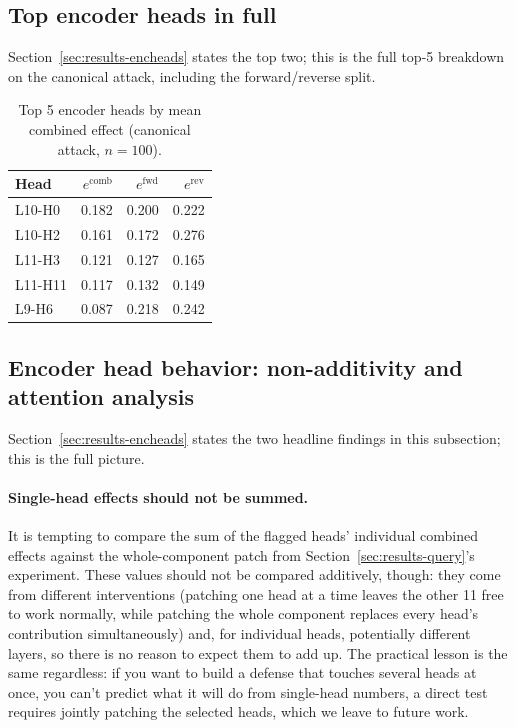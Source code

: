 \documentclass[11pt]{article}
\newcommand{\fwd}{\ensuremath{e^{\mathrm{fwd}}}}
\newcommand{\rev}{\ensuremath{e^{\mathrm{rev}}}}
\newcommand{\comb}{\ensuremath{e^{\mathrm{comb}}}}
\begin{document}
\subsection{Top encoder heads in full}
\label{sec:appendix-enctable}

Section~\ref{sec:results-encheads} states the top two; this is the full
top-5 breakdown on the canonical attack, including the forward/reverse
split.

\begin{table}[H]
\centering
\caption{Top 5 encoder heads by mean combined effect (canonical attack,
$n=100$).}
\label{tab:enctophead}
\small
\begin{tabular}{lrrr}
\toprule
Head & $\comb$ & $\fwd$ & $\rev$ \\
\midrule
L10-H0  & 0.182 & 0.200 & 0.222 \\
L10-H2  & 0.161 & 0.172 & 0.276 \\
L11-H3  & 0.121 & 0.127 & 0.165 \\
L11-H11 & 0.117 & 0.132 & 0.149 \\
L9-H6   & 0.087 & 0.218 & 0.242 \\
\bottomrule
\end{tabular}
\end{table}

\subsection{Encoder head behavior: non-additivity and attention analysis}
\label{sec:appendix-encoderhead-behavior}

Section~\ref{sec:results-encheads} states the two headline findings in
this subsection; this is the full picture.

\paragraph{Single-head effects should not be summed.} It is tempting to
compare the sum of the flagged heads' individual combined effects against
the whole-component patch from Section~\ref{sec:results-query}'s
experiment. These values should not be compared additively, though:
they come from different interventions (patching one head at a time
leaves the other 11 free to work normally, while patching the whole
component replaces every head's contribution simultaneously) and, for
individual heads, potentially different layers, so there is no reason to
expect them to add up. The practical lesson is the same regardless: if
you want to build a defense that touches several heads at once, you
can't predict what it will do from single-head numbers, a direct test
requires jointly patching the selected heads, which we leave to future
work.
\end{document}
